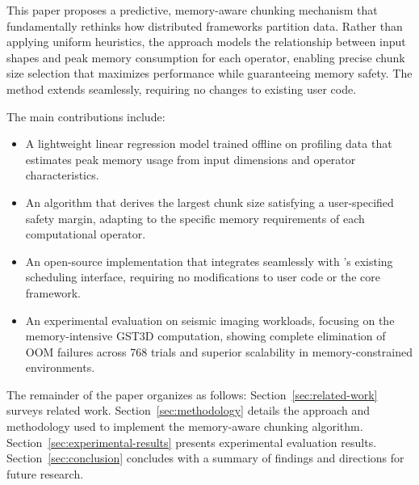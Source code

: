 This paper proposes a predictive, memory-aware chunking mechanism that fundamentally rethinks how distributed frameworks partition data.
Rather than applying uniform heuristics, the approach models the relationship between input shapes and peak memory consumption for each operator, enabling precise chunk size selection that maximizes performance while guaranteeing memory safety.
The method extends \dask seamlessly, requiring no changes to existing user code.

The main contributions include:

\begin{itemize}
    \item A lightweight linear regression model trained offline on profiling data that estimates peak memory usage from input dimensions and operator characteristics.
    \item An algorithm that derives the largest chunk size satisfying a user-specified safety margin, adapting to the specific memory requirements of each computational operator.
    \item An open-source implementation that integrates seamlessly with \dask's existing scheduling interface, requiring no modifications to user code or the core framework.
    \item An experimental evaluation on seismic imaging workloads, focusing on the memory-intensive \ac{GST3D} computation, showing complete elimination of \ac{OOM} failures across 768 trials and superior scalability in memory-constrained environments.
\end{itemize}

The remainder of the paper organizes as follows: 
Section~\ref{sec:related-work} surveys related work.
Section~\ref{sec:methodology} details the approach and methodology used to implement the memory-aware chunking algorithm.
Section~\ref{sec:experimental-results} presents experimental evaluation results.
Section~\ref{sec:conclusion} concludes with a summary of findings and directions for future research.